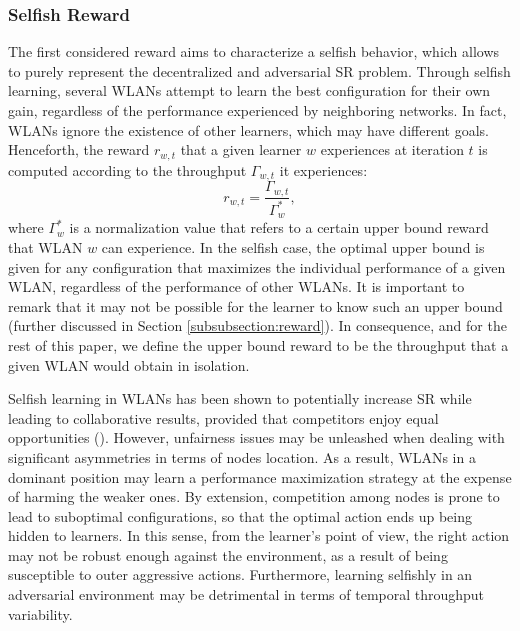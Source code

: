 \documentclass{article}
\begin{document}
\subsubsection{Selfish Reward}
\label{subsubsection:selfish_learning}
The first considered reward aims to characterize a selfish behavior, which allows to purely represent the decentralized and adversarial SR problem. Through selfish learning, several WLANs attempt to learn the best configuration for their own gain, regardless of the performance experienced by neighboring networks. In fact, WLANs ignore the existence of other learners, which may have different goals. Henceforth, the reward $r_{w,t}$ that a given learner $w$ experiences at iteration $t$ is computed according to the throughput $\Gamma_{w,t}$ it experiences: 
\begin{equation}
r_{w,t} = \frac{\Gamma_{w,t}}{\Gamma_w^*}, 
\nonumber
\end{equation}		
where $\Gamma_w^*$ is a normalization value that refers to a certain upper bound reward that WLAN $w$ can experience. In the selfish case, the optimal upper bound is given for any configuration that maximizes the individual performance of a given WLAN, regardless of the performance of other WLANs. It is important to remark that it may not be possible for the learner to know such an upper bound (further discussed in Section \ref{subsubsection:reward}). In consequence, and for the rest of this paper, we define the upper bound reward to be the throughput that a given WLAN would obtain in isolation.

Selfish learning in WLANs has been shown to potentially increase SR while leading to collaborative results, provided that competitors enjoy equal opportunities (\citealp{wilhelmi2017collaborative}). However, unfairness issues may be unleashed when dealing with significant asymmetries in terms of nodes location. As a result, WLANs in a dominant position may learn a performance maximization strategy at the expense of harming the weaker ones. By extension, competition among nodes is prone to lead to suboptimal configurations, so that the optimal action ends up being hidden to learners. In this sense, from the learner's point of view, the right action may not be robust enough against the environment, as a result of being susceptible to outer aggressive actions. Furthermore, learning selfishly in an adversarial environment may be detrimental in terms of temporal throughput variability. 

\end{document}

